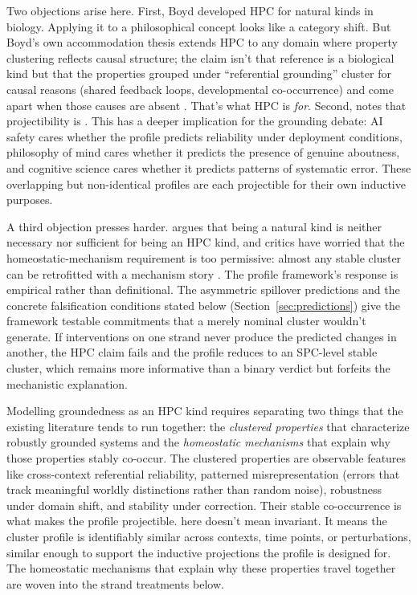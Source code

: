 \documentclass[12pt]{article}
\begin{document}
Two objections arise here. First, Boyd developed HPC for natural kinds in biology. Applying it to a philosophical concept looks like a category shift. But Boyd's own accommodation thesis extends HPC to any domain where property clustering reflects causal structure; the claim isn't that reference is a biological kind but that the properties grouped under \enquote{referential grounding} cluster for causal reasons (shared feedback loops, developmental co-occurrence) and come apart when those causes are absent \citep[147--148]{boyd_1999_homeostasis}. That's what HPC is \emph{for}. Second, \textcite[148]{boyd_1999_homeostasis} notes that projectibility is . This has a deeper implication for the grounding debate: AI safety cares whether the profile predicts reliability under deployment conditions, philosophy of mind cares whether it predicts the presence of genuine aboutness, and cognitive science cares whether it predicts patterns of systematic error. These overlapping but non-identical profiles are each projectible for their own inductive purposes.

A third objection presses harder. \textcite{magnus_2014_nk_neq_hpc} argues that being a natural kind is neither necessary nor sufficient for being an HPC kind, and critics have worried that the homeostatic-mechanism requirement is too permissive: almost any stable cluster can be retrofitted with a mechanism story \citep[see][]{craver_2009_mechanisms_natural_kinds}. The profile framework's response is empirical rather than definitional. The asymmetric spillover predictions and the concrete falsification conditions stated below (Section~\ref{sec:predictions}) give the framework testable commitments that a merely nominal cluster wouldn't generate. If interventions on one strand never produce the predicted changes in another, the HPC claim fails and the profile reduces to an SPC-level stable cluster, which remains more informative than a binary verdict but forfeits the mechanistic explanation.

Modelling groundedness as an HPC kind requires separating two things that the existing literature tends to run together: the \emph{clustered properties} that characterize robustly grounded systems and the \emph{homeostatic mechanisms} that explain why those properties stably co-occur. The clustered properties are observable features like cross-context referential reliability, patterned misrepresentation (errors that track meaningful worldly distinctions rather than random noise), robustness under domain shift, and stability under correction. Their stable co-occurrence is what makes the profile projectible.  here doesn't mean invariant. It means the cluster profile is identifiably similar across contexts, time points, or perturbations, similar enough to support the inductive projections the profile is designed for. The homeostatic mechanisms that explain why these properties travel together are woven into the strand treatments below.
\end{document}
